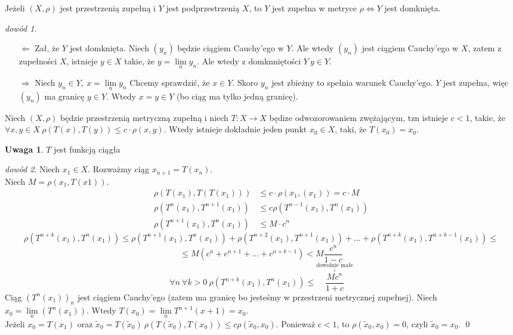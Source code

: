 \documentclass[twoside,10pt]{article}
\newcommand{\overscript}[3]{\overset{\scriptstyle{\underset{#2}{#3}}}{#1}}
\theoremstyle{definition}
\theoremstyle{definition}
\theoremstyle{definition}
\theoremstyle{definition}
\theoremstyle{remark}
\newtheorem*{dd}{dowód}
\theoremstyle{definition}
\newtheorem*{uw}{Uwaga}
\theoremstyle{definition}
\theoremstyle{definition}
\theoremstyle{definition}
\theoremstyle{definition}
\theoremstyle{definition}
\begin{document}
\begin{tw} Jeżeli $(X,\rho)$ jest przestrzenią zupełną i $Y$ jest podprzestrzenią $X$, to $Y$ jest 
    zupełna w metryce $\rho \Leftrightarrow Y$ jest domknięta.
\end{tw}
\begin{dd} \hfill 
    \begin{itemize} 
        \item[$\Leftarrow$] Zał, że $Y$ jest domknięta. Niech $(y_n)$ będzie ciągiem Cauchy'ego w $Y$. 
            Ale wtedy $(y_n)$ jest ciągiem Cauchy'ego w $X$, zatem z zupełności $X$, istnieje $y \in X$ takie, że
            $ y= \lim\limits_n y_n$. Ale wtedy z domknniętości $Y \ y \in Y$.
        \item[$\Rightarrow$] Niech $y_n \in Y, \ x = \lim\limits_n y_n$ Chcemy sprawdzić, że 
            $x \in Y$. Skoro $y_n$ jest zbieżny to spełnia warunek Cauchy'ego. $Y$ jest zupełna, więc $(y_n)$
            ma granicę $y \in Y$. Wtedy $x = y \in Y$ (bo ciąg ma tylko jedną granicę).
    \end{itemize} 
\end{dd} 
\begin{tw} Niech $(X,\rho)$ będzie przestrzenią metryczną zupełną 
    i niech $T: X \to X$ będize odwozorowaniem zwężającym, tzn istnieje $c < 1$, takie, że 
    $\forall x,y \in X \ \rho( T (x), T (y)) \le c \cdot \rho(x,y)$. Wtedy istnieje dokładnie 
    jeden punkt $x_0 \in X$, taki, że $ T (x_0) = x_0$.
\end{tw} 
\begin{uw} $T$ jest funkcją ciągła \end{uw} 
\begin{dd} 
    Niech $x_1 \in X$. Rozważmy ciąg $x_{n+1} =  T (x_n)$. \\ 
    Niech $M = \rho(x_1, T (x1)).$
    \begin{align*}
        \rho ( T (x_1), T( T (x_1))) &\le c \cdot \rho(x_1, (x_1)) = c \cdot M \\ 
        \rho ( T ^n (x_1), T ^ {n+1}(x_1)) &\le c \rho( T^{n-1} (x_1), T^n (x_1)) \\
        \rho( T ^ {n+1}(x_1), T ^ n (x_1)) &\le M \cdot c^n 
    \end{align*} 
    \[
        \rho( T^{n+k} (x_1), T^n (x_1)) \le \rho ( T ^{n+1} (x_1), T^n(x_1)) + 
    \rho ( T^{n+2}(x_1), T^{n+1}(x_1)) + \ldots + \rho( T^{n+k}(x_1), T^{n+k-1}(x_1)) \le \]
    \[\le M(c^n + c^{n+1} + \ldots + c^{n+k-1}) < M \frac{c^n}{1-c} \]
    \[ \forall n \ \forall k > 0 \ \rho( T^{n+k}(x_1), T ^n(x_1)) \le 
    \overscript{\frac{M c^n}{1+c}}{\downarrow}{\text{dowolnie małe}} \]
    Ciąg $( T^n (x_1))_n$ jest ciągiem Cauchy'ego (zatem ma granicę bo jesteśmy w przestrzeni metrycznej zupełnej).
    Niech $x_0 = \lim\limits_n ( T^n (x_1))$. Wtedy $ T(x_0) = \lim\limits_n  T^{n+1}(x+1) = x_0$. \\ 
    Jeżeli $x_0 = T(x_1)$ oraz $\tilde x_0 = T(\tilde x_0) \ \rho(T(\tilde x_0),T(x_0)) \le c \rho(\tilde x_0,x_0)$. 
    Ponieważ $c < 1$, to $\rho(\tilde x_0,x_0) = 0$, czyli $\tilde x_0 = x_0$. \hfill \qed 
\end{dd} 
\end{document}
